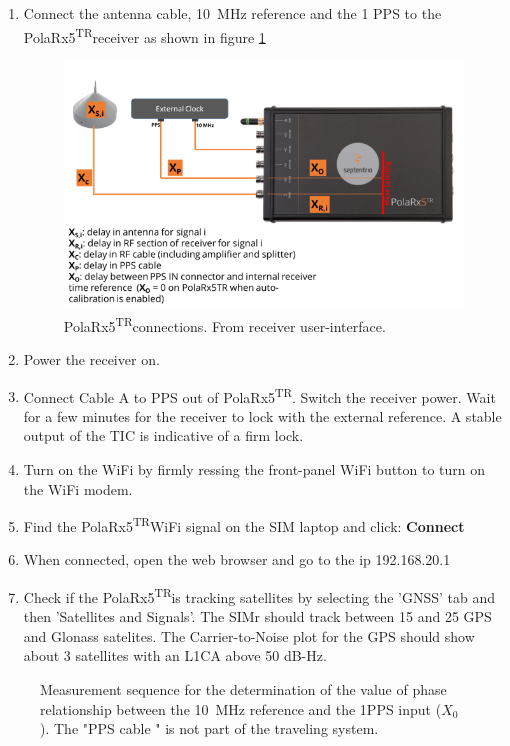 \documentclass[11pt]{article}
\newcommand{\polar}[0]{PolaRx5\textsuperscript{TR}}
\begin{document}
\begin{enumerate}
    \item Connect the antenna cable, \SI{10}{\mega\hertz} reference and the 1 PPS to the \polar receiver as shown in figure \ref{fig:cggttsdelays.png}
    
    \begin{figure}[ht]
    \begin{center}
    \includegraphics[width=0.8\linewidth]{./Figures/cggttsdelays.png}
    \caption{\polar connections. From receiver user-interface. } \label{fig:cggttsdelays.png}
    \end{center}
    \end{figure}

    
    \item Power the receiver on.
    \item Connect Cable A to PPS out of \polar. Switch the receiver power. Wait for a few minutes for the receiver to lock with the external reference. A stable output of the TIC is indicative of a firm lock.
    \item Turn on the WiFi by firmly ressing the front-panel WiFi button to turn on the WiFi modem.
    \item Find the \polar WiFi signal on the SIM laptop and click: \textbf{Connect}
    \item When connected, open the web browser and go to the ip 192.168.20.1
    \item Check if the \polar is tracking satellites by selecting the 'GNSS' tab and then 'Satellites and Signals'. The SIMr should track between 15 and 25 GPS and Glonass satelites. The Carrier-to-Noise plot for the GPS should show about 3 satellites with an L1CA above 50 dB-Hz.
\end{enumerate}

\begin{figure}[ht]
\begin{center}

\caption{Measurement sequence for the determination of the value of phase relationship between the \SI{10}{\mega\hertz} reference and the 1PPS input ($X_0$). The "PPS cable " is not part of the traveling system.} \label{fig:cabledelaymeasurement}
\end{center}
\end{figure}
\end{document}
